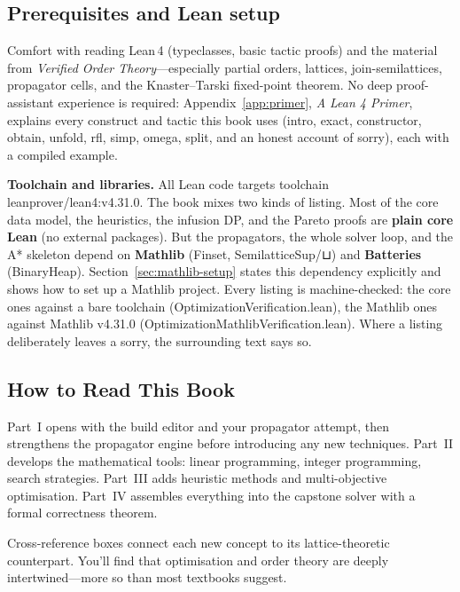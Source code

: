\documentclass[11pt, a4paper, oneside]{book}
\newcommand{\li}[1]{{\ttfamily\small\color{deepblue}#1}}
\begin{document}
\subsection*{Prerequisites and Lean setup}

Comfort with reading Lean\,4 (typeclasses, basic tactic proofs) and the material
from \emph{Verified Order Theory}---especially partial orders, lattices,
join-semilattices, propagator cells, and the Knaster--Tarski fixed-point
theorem.  No deep proof-assistant experience is required:
Appendix~\ref{app:primer}, \emph{A Lean 4 Primer}, explains every construct and
tactic this book uses (\li{intro}, \li{exact}, \li{constructor}, \li{obtain},
\li{unfold}, \li{rfl}, \li{simp}, \li{omega}, \li{split}, and an honest account
of \li{sorry}), each with a compiled example.

\medskip\noindent\textbf{Toolchain and libraries.}  All Lean code targets
toolchain \li{leanprover/lean4:v4.31.0}.  The book mixes two kinds of listing.
Most of the core data model, the heuristics, the infusion DP, and the Pareto
proofs are \textbf{plain core Lean} (no external packages).  But the propagators,
the whole solver loop, and the A* skeleton depend on \textbf{Mathlib}
(\li{Finset}, \li{SemilatticeSup}/\li{⊔}) and \textbf{Batteries}
(\li{BinaryHeap}).  Section~\ref{sec:mathlib-setup} states this dependency
explicitly and shows how to set up a Mathlib project.  Every listing is
machine-checked: the core ones against a bare toolchain
(\li{OptimizationVerification.lean}), the Mathlib ones against Mathlib
v4.31.0 (\li{OptimizationMathlibVerification.lean}).  Where a listing
deliberately leaves a \li{sorry}, the surrounding text says so.

\subsection*{How to Read This Book}

Part~I opens with the build editor and your propagator attempt, then
strengthens the propagator engine before introducing any new techniques.
Part~II develops the mathematical tools: linear programming, integer
programming, search strategies.  Part~III adds heuristic methods and
multi-objective optimisation.  Part~IV assembles everything into the capstone
solver with a formal correctness theorem.

Cross-reference boxes connect each new concept to its lattice-theoretic
counterpart.  You'll find that optimisation and order theory are deeply
intertwined---more so than most textbooks suggest.
\end{document}
